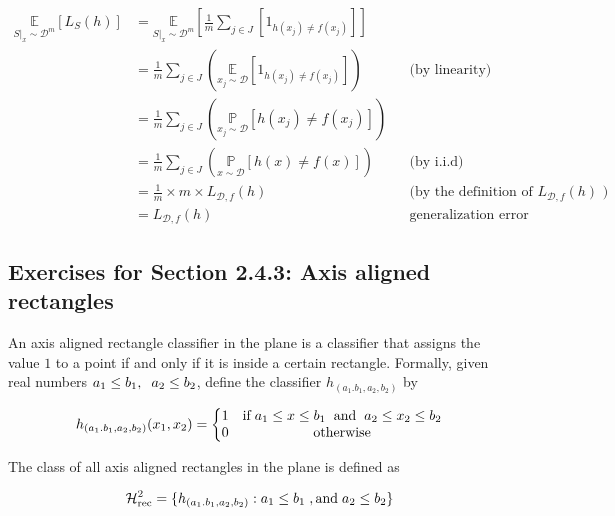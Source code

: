 \documentclass[]{book}
\theoremstyle{definition}
\begin{document}
       \begin{align*}
      \underset{S|_x \sim \mathcal{D}^m}{\mathbb{E}}[L_S(h)] & =\underset{S|_x \sim \mathcal{D}^m}{\mathbb{E}}\left [\frac{1}{m}\sum_{j\in J}[1_{h(x_j)\neq f(x_j)}]\right ] \\
     & =\frac{1}{m}\sum_{j\in J} \left ( \underset{x_j \sim \mathcal{D}}{\mathbb{E}}\left [1_{h(x_j)\neq f(x_j)}\right ] \right ) && \text{(by linearity)}
     \\
     & =\frac{1}{m}\sum_{j\in J} \left ( \underset{x_j \sim \mathcal{D}}{\mathbb{P}}\left [{h(x_j)\neq f(x_j)}\right ] \right ) 
     \\
      & =\frac{1}{m}\sum_{j\in J} \left ( \underset{x \sim \mathcal{D}}{\mathbb{P}}\left [{h(x)\neq f(x)}\right ] \right ) && \text{(by i.i.d)}
      \\
     & =\frac{1}{m} \times m \times  L_{\mathcal{D},f}(h) && \text{(by the definition of $L_{\mathcal{D},f}(h)$ )} 
     \\
     &= L_{\mathcal{D},f}(h) && \text{generalization error}
  \end{align*}
    
\subsection*{Exercises for Section 2.4.3: Axis aligned rectangles}

An axis aligned rectangle classifier in the plane is a classifier that assigns the value $1$ to a point if and only if it is inside a certain rectangle.
Formally, given real numbers $a_1 \leq b_1, \hspace{0.2 cm} a_2 \leq b_2 $, define the classifier $h_{(a_1.b_1,a_2,b_2)}$ by

\begin{equation*}
   h_{(a_1.b_1,a_2,b_2)}(x_1,x_2)= \left\{\begin{matrix}
1 &  \text{if} \hspace{0.1cm} a_1 \leq x \leq b_1 \hspace{0.2cm} \text{and} \hspace{0.2cm} a_2 \leq x_2 \leq b_2 \\ 
0 & \text{otherwise}
\end{matrix}\right. 
\end{equation*}

The class of all axis aligned rectangles in the plane is defined as

\begin{equation*}
    \mathcal{H}_{\text{rec}}^2=\{ h_{(a_1.b_1,a_2,b_2)}:a_1 \leq b_1 \hspace{0.1 cm}, \text{and}\hspace{0,1 cm} a_2\leq b_2\}
\end{equation*}
\end{document}
